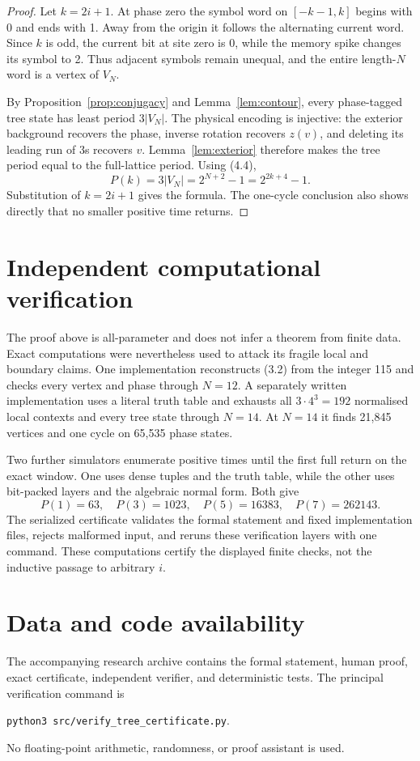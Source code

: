 \documentclass[11pt]{amsart}
\theoremstyle{definition}
\begin{document}
\begin{proof}
Let \(k=2i+1\).  At phase zero the symbol word on \([-k-1,k]\) begins with
0 and ends with 1.  Away from the origin it follows the alternating current
word.  Since \(k\) is odd, the current bit at site zero is 0, while the memory
spike changes its symbol to 2.  Thus adjacent symbols remain unequal, and the
entire length-\(N\) word is a vertex of \(V_N\).

By Proposition~\ref{prop:conjugacy} and
Lemma~\ref{lem:contour}, every phase-tagged tree state has least period
\(3|V_N|\).  The physical encoding is injective: the exterior background
recovers the phase, inverse rotation recovers \(z(v)\), and deleting its
leading run of 3s recovers \(v\).  Lemma~\ref{lem:exterior} therefore makes
the tree period equal to the full-lattice period.  Using (4.4),
\[
P(k)=3|V_N|=2^{N+2}-1=2^{2k+4}-1.
\]
Substitution of \(k=2i+1\) gives the formula.  The one-cycle conclusion also
shows directly that no smaller positive time returns.
\end{proof}

\section{Independent computational verification}

The proof above is all-parameter and does not infer a theorem from finite
data.  Exact computations were nevertheless used to attack its fragile local
and boundary claims.  One implementation reconstructs (3.2) from the integer
115 and checks every vertex and phase through \(N=12\).  A separately written
implementation uses a literal truth table and exhausts all
\(3\cdot4^3=192\) normalised local contexts and every tree state through
\(N=14\).  At \(N=14\) it finds 21,845 vertices and one cycle on 65,535 phase
states.

Two further simulators enumerate positive times until the first full return on
the exact window.  One uses dense tuples and the truth table, while the other
uses bit-packed layers and the algebraic normal form.  Both give
\[
P(1)=63,\quad P(3)=1023,\quad P(5)=16383,\quad
P(7)=262143.
\]
The serialized certificate validates the formal statement and fixed
implementation files, rejects malformed input, and reruns these verification
layers with one command.  These computations certify the displayed finite
checks, not the inductive passage to arbitrary \(i\).

\section*{Data and code availability}

The accompanying research archive contains the formal statement, human proof,
exact certificate, independent verifier, and deterministic tests.  The
principal verification command is
\begin{center}
\texttt{python3 src/verify\_tree\_certificate.py}.
\end{center}
No floating-point arithmetic, randomness, or proof assistant is used.



\end{document}
